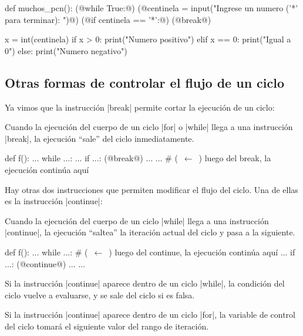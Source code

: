 \begin{codigo-python-sn}
def muchos_pcn():
    (@while True:@)
        (@centinela = input("Ingrese un numero ('*' para terminar): ")@)
        (@if centinela == '*':@)
            (@break@)

        x = int(centinela)
        if x > 0:
            print("Numero positivo")
        elif x == 0:
            print("Igual a 0")
        else:
            print("Numero negativo")
\end{codigo-python-sn}

\subsection{Otras formas de controlar el flujo de un ciclo}

Ya vimos que la instrucción |break| permite cortar la ejecución de un ciclo:

\begin{observacion}
Cuando la ejecución del cuerpo de un ciclo |for| o |while| llega a una
instrucción |break|, la ejecución ``sale'' del ciclo inmediatamente.

\begin{codigo-python-sn}
def f():
    ...
    while ...:
        ...
        if ...:
            (@break@)
        ...
    ... # (~$\leftarrow$~) luego del break, la ejecución continúa aquí
\end{codigo-python-sn}
\end{observacion}

Hay otras dos instrucciones que permiten modificar el flujo del ciclo. Una de
ellas es la instrucción |continue|:

\begin{observacion}
Cuando la ejecución del cuerpo de un ciclo |while| llega a una
instrucción |continue|, la ejecución ``saltea'' la iteración actual del ciclo y
pasa a la siguiente.

\begin{codigo-python-sn}
def f():
    ...
    while ...: # (~$\leftarrow$~) luego del continue, la ejecución continúa aquí
        ...
        if ...:
            (@continue@)
        ...
    ...
\end{codigo-python-sn}
\end{observacion}

Si la instrucción |continue| aparece dentro de un ciclo |while|, la condición
del ciclo vuelve a evaluarse, y se sale del ciclo si es falsa.

Si la instrucción |continue| aparece dentro de un ciclo |for|, la variable de
control del ciclo tomará el siguiente valor del rango de iteración.

